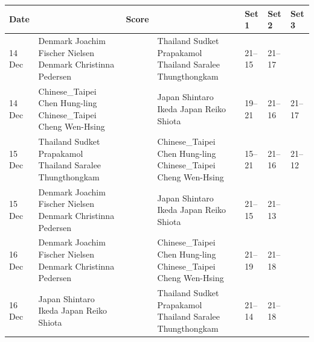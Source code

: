 \documentclass{article}
\begin{document}
\begin{tabular}{lllllll}
\toprule
Date &  & Score &  & Set 1 & Set 2 & Set 3 \\
\midrule
14 Dec & Denmark Joachim Fischer Nielsen Denmark Christinna Pedersen &  & Thailand Sudket Prapakamol Thailand Saralee Thungthongkam & 21–15 & 21–17 &  \\
14 Dec & Chinese\_Taipei Chen Hung-ling Chinese\_Taipei Cheng Wen-Hsing &  & Japan Shintaro Ikeda Japan Reiko Shiota & 19–21 & 21–16 & 21–17 \\
15 Dec & Thailand Sudket Prapakamol Thailand Saralee Thungthongkam &  & Chinese\_Taipei Chen Hung-ling Chinese\_Taipei Cheng Wen-Hsing & 15–21 & 21–16 & 21–12 \\
15 Dec & Denmark Joachim Fischer Nielsen Denmark Christinna Pedersen &  & Japan Shintaro Ikeda Japan Reiko Shiota & 21–15 & 21–13 &  \\
16 Dec & Denmark Joachim Fischer Nielsen Denmark Christinna Pedersen &  & Chinese\_Taipei Chen Hung-ling Chinese\_Taipei Cheng Wen-Hsing & 21–19 & 21–18 &  \\
16 Dec & Japan Shintaro Ikeda Japan Reiko Shiota &  & Thailand Sudket Prapakamol Thailand Saralee Thungthongkam & 21–14 & 21–18 &  \\
\bottomrule
\end{tabular}
\end{document}
